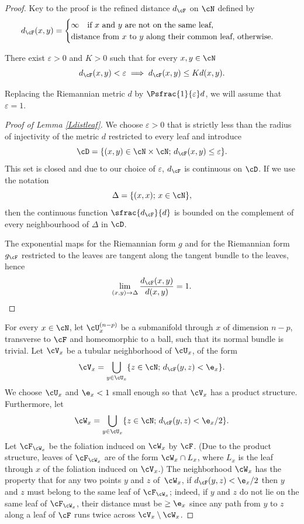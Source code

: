 \begin{proof}
Key to the proof is the refined distance $d_\cF$ on $\cN$ defined by
\[
d_\cF(x,y) =
\begin{cases}
\infty \quad \text{if $x$ and $y$ are not on the same leaf,}\\
\text{distance from $x$ to $y$ along their common leaf, otherwise}.
\end{cases}
\]

\begin{lemma}\label{Ldistleaf}
There exist $\varepsilon>0$ and $K>0$ such that for every $x,y \in \cN$
\begin{equation}
\label{eq:dF}
d_\cF(x,y)<\varepsilon \implies d_\cF(x,y) \leq K d(x,y).
\end{equation}
\end{lemma}

Replacing the Riemannian metric $d$ by $\Psfrac{1}{\varepsilon}d$, we will assume that $\varepsilon=1$.

\begin{proof}[Proof of Lemma \ref{Ldistleaf}]
We choose $\varepsilon>0$ that is strictly less than the radius of injectivity of the metric $d$ restricted to every leaf and introduce
\[
\cD=\{ (x, y)\in\cN\times\cN;\, d_{\cF}(x, y)\leq\varepsilon\}.
\]
This set is closed and due to our choice of $\varepsilon$, $d_\cF$ is continuous on $\cD$. If we use the notation
\[
\Delta=\{ (x, x);\, x\in\cN\},
\]
then the continuous function $\sfrac{d_\cF}{d}$ is bounded on the complement of every neighbourhood of $\Delta$ in $\cD$.

The exponential maps for the Riemannian form $g$ and for the Riemannian form $g_\cF$ restricted to the leaves are tangent along the tangent bundle to the leaves, hence
\[
\lim_{(x, y)\to \Delta}\frac{d_\cF(x, y)}{d(x,y)}=1.\qedhere
\]
\end{proof}

For every $x \in \cN$, let $\cU_x^{(n-p)}$ be a submanifold through $x$ of dimension $n-p$, transverse to $\cF$ and homeomorphic to a ball, such that its normal bundle is trivial. Let $\cV_x$ be a tubular neighborhood of $\cU_x$, of the form
\[
\cV_x = \bigcup_{y\in \cU_x} \{z\in \cN;\, d_\cF(y,z)<\e_x\}.
\]
We choose $\cU_x$ and $\e_x<1$ small enough so that $\cV_x$ has a product structure. Furthermore, let
\[
\cW_x = \bigcup_{y\in \cU_x} \{z\in \cN;\, d_\cF(y,z)<\e_x/2\}.
\]
Let $\cF_{\cW_x}$ be the foliation induced on $\cW_x$ by $\cF$. (Due to the product structure, leaves of $\cF_{\cW_x}$ are of the form $\cW_x \cap L_x$, where $L_x$ is the leaf through $x$ of the foliation induced on $\cV_x$.) The neighborhood $\cW_x$ has the property that for any two points $y$ and $z$ of~$\cW_x$, if $d_\cF(y,z) <\e_x/2$ then $y$ and $z$ must belong to the same leaf of $\cF_{\cW_x}$; indeed, if $y$ and $z$ do not lie on the same leaf of $\cF_{\cW_x}$, their distance must be $\geq\e_x$ since any path from $y$ to $z$ along a leaf of $\cF$ runs twice across $\cV_x \setminus \cW_x$.


\end{proof}
